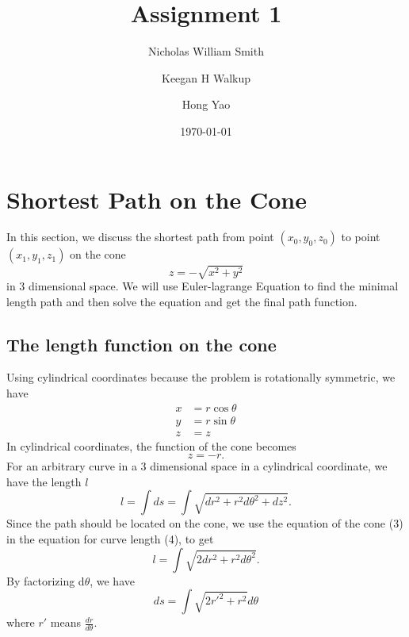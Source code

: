 \documentclass[%
 reprint,
 amsmath,amssymb,
 aps,
]{revtex4-1}
\begin{document}

\title{Assignment 1}
\author{Nicholas William Smith}
\author{Keegan H Walkup}
\author{Hong Yao}

%




\date{\today}%



\maketitle



\section{\label{sec:level1}Shortest Path on the Cone}
In this section, we discuss the shortest path from point $(x_0,y_0,z_0)$ to point $(x_1,y_1,z_1)$ on the cone 
\begin{equation}
    z=-\sqrt{x^2+y^2}
\end{equation}
in 3 dimensional space. We will use Euler-lagrange Equation to find the minimal length path and then solve the equation and get the final path function.

\subsection{\label{sec:level2}The length function on the cone}
Using cylindrical coordinates because the problem is rotationally symmetric, we have
\begin{equation}
\begin{aligned}
x&=r\cos{\theta}
\\y&=r\sin{\theta}
\\z&=z
\end{aligned}
\end{equation}
In cylindrical coordinates, the function of the cone becomes
\begin{equation}
    z=-r.
\end{equation}
For an arbitrary curve in a 3 dimensional space in a cylindrical coordinate, we have the length $l$
\begin{equation}
    l=\int ds=\int\sqrt{dr^2+r^2d\theta^2+dz^2}.
\end{equation}
Since the path should be located on the cone, we use the equation of the cone (3) in the equation for curve length (4), to get
\begin{equation}
    l=\int\sqrt{2dr^2+r^2d\theta^2}.
\end{equation}
By factorizing d$\theta$, we have
\begin{equation}
    ds=\int\sqrt{2r'^2+r^2}d\theta
\end{equation}
where $r'$ means $\frac{dr}{d\theta}$.
\end{document}
